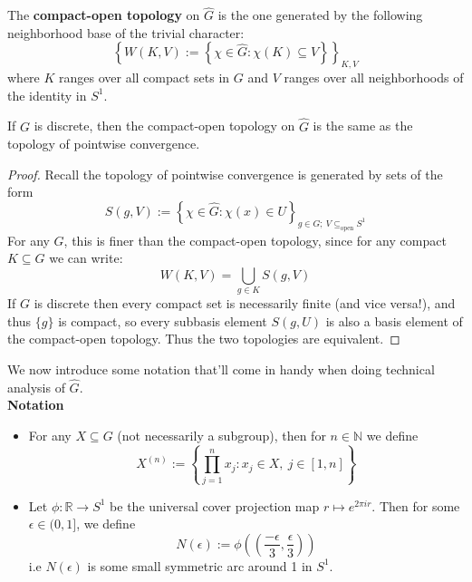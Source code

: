 \documentclass[11pt, x11names]{book}
\newcommand{\nn}{\mathbb{N}}
\newcommand{\rr}{\mathbb{R}}
\newcommand{\set}[1]{\left\{ #1 \right\}}
\renewcommand{\brack}[1]{\left(   #1 \right)}
\renewcommand{\hat}{\widehat}
\begin{document}
\begin{defn}
The \textbf{compact-open topology} on $\hat{G}$ is the one generated by the following neighborhood base
of the trivial character:
\begin{equation*}
    \set{W(K, V) := \set{\chi \in \hat{G} : \chi(K) \subseteq V}}_{K, V}
\end{equation*}
where $K$ ranges over all compact sets in $G$ and $V$ ranges over all neighborhoods of the identity 
in $S^1$.
\end{defn}

\begin{prop}
\label{compact-open = ptwise convergence}
If $G$ is discrete, then  the compact-open topology on $\hat{G}$ is the same as the topology 
of pointwise convergence.
\end{prop}
\begin{proof}
Recall the topology of pointwise convergence is generated by sets of the form
\begin{equation*}
    S(g, V) := \set{\chi \in \hat{G} : \chi(x) \in U}_{g \in G; \ V \subseteq_{\textrm{open}} S^1}
\end{equation*}
For any $G$, this is finer than the compact-open topology, since for any compact $K \subseteq G$ we can write:
\begin{equation*}
    W(K, V) = \bigcup_{g \in K} S(g, V)
\end{equation*} 
If $G$ is discrete then every compact set is necessarily finite (and vice versa!), and thus $\{g\}$ is compact, so every subbasis element $S(g, U)$ is also a basis element of the compact-open topology. Thus the two topologies are equivalent.
\end{proof}

We now introduce some notation that'll come in handy when doing technical analysis of $\hat{G}$.\\
\textbf{Notation}
\begin{itemize}
    \item For any $X \subseteq G$ (not necessarily a subgroup), then for $n \in \nn$ we define
    \begin{equation*}
        X^{(n)} := \set{\prod^n_{j=1} x_j: x_j \in X, \ j \in [1, n]}
    \end{equation*}
    \item Let $\phi: \rr \to S^1$ be the universal cover projection map $r \mapsto e^{2 \pi i r}$.
    Then for some $\epsilon \in (0, 1]$, we define
    \begin{equation*}
        N(\epsilon) := \phi\brack{\brack{\frac{-\epsilon}{3}, \frac{\epsilon}{3}}}
    \end{equation*}
    i.e $N(\epsilon)$ is some small symmetric arc around 1 in $S^1$.
\end{itemize}
\end{document}
